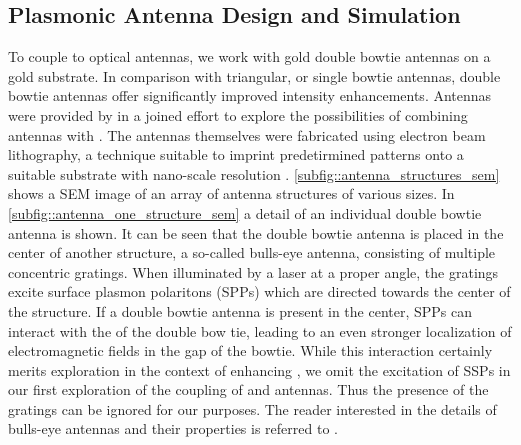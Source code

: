 	\subsection{Plasmonic Antenna Design and Simulation} \label{sec::structure_antenna}

		 To couple \sivs to optical antennas, we work with gold double bowtie antennas on a gold substrate. In comparison with triangular, or single bowtie antennas, double bowtie antennas offer significantly improved intensity enhancements. Antennas were provided by \nancy in a joined effort to explore the possibilities of combining antennas with \sivs. The antennas themselves were fabricated using electron beam lithography, a technique suitable to imprint predetirmined patterns onto a suitable substrate with nano-scale resolution \cite{nancy::232}. \autoref{subfig::antenna_structures_sem} shows a SEM image of an array of antenna structures of various sizes. In \autoref{subfig::antenna_one_structure_sem} a detail of an individual double bowtie antenna is shown. It can be seen that the double bowtie antenna is placed in the center of another structure, a so-called bulls-eye antenna, consisting of multiple concentric gratings. When illuminated by a laser at a proper angle, the gratings excite surface plasmon polaritons (SPPs) which are directed towards the center of the structure. If a double bowtie antenna is present in the center, SPPs can interact with the \LSPs of the double bow tie, leading to an even stronger localization of electromagnetic fields in the gap of the bowtie. While this interaction certainly merits exploration in the context of enhancing \sivs, we omit the excitation of SSPs in our first exploration of the coupling of \sivs and antennas. Thus the presence of the gratings can be ignored for our purposes. The reader interested in the details of bulls-eye antennas and their properties is referred to \cite{rahbany2016towards}.

